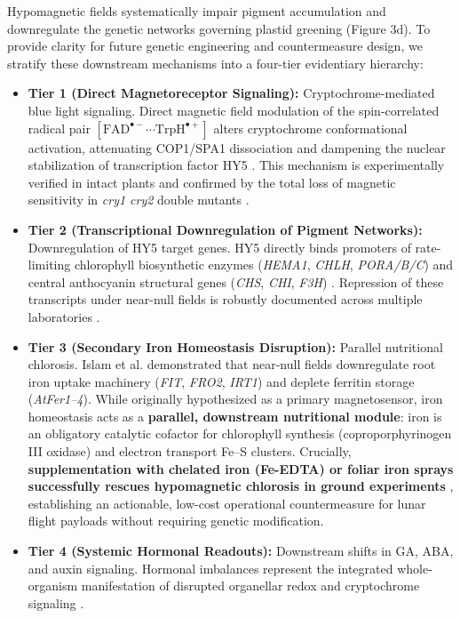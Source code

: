 \documentclass[default,sn-nature,iicol]{sn-jnl}
\begin{document}
Hypomagnetic fields systematically impair pigment accumulation and downregulate the genetic networks governing plastid greening (Figure 3d). To provide clarity for future genetic engineering and countermeasure design, we stratify these downstream mechanisms into a four-tier evidentiary hierarchy:
\begin{itemize}
\item \textbf{Tier 1 (Direct Magnetoreceptor Signaling):} Cryptochrome-mediated blue light signaling. Direct magnetic field modulation of the spin-correlated radical pair $[\text{FAD}^{\bullet-} \cdots \text{TrpH}^{\bullet+}]$ alters cryptochrome conformational activation, attenuating COP1/SPA1 dissociation and dampening the nuclear stabilization of transcription factor HY5 \cite{ref49,ref50,ref51,ref58}. This mechanism is experimentally verified in intact plants and confirmed by the total loss of magnetic sensitivity in \textit{cry1 cry2} double mutants \cite{ref51,ref58}.
\item \textbf{Tier 2 (Transcriptional Downregulation of Pigment Networks):} Downregulation of HY5 target genes. HY5 directly binds promoters of rate-limiting chlorophyll biosynthetic enzymes (\textit{HEMA1}, \textit{CHLH}, \textit{PORA/B/C}) and central anthocyanin structural genes (\textit{CHS}, \textit{CHI}, \textit{F3H}) \cite{ref47,ref48}. Repression of these transcripts under near-null fields is robustly documented across multiple laboratories \cite{ref31,ref44,ref45,ref46}.
\item \textbf{Tier 3 (Secondary Iron Homeostasis Disruption):} Parallel nutritional chlorosis. Islam et al. \cite{ref53,ref54} demonstrated that near-null fields downregulate root iron uptake machinery (\textit{FIT}, \textit{FRO2}, \textit{IRT1}) and deplete ferritin storage (\textit{AtFer1--4}). While originally hypothesized as a primary magnetosensor, iron homeostasis acts as a \textbf{parallel, downstream nutritional module}: iron is an obligatory catalytic cofactor for chlorophyll synthesis (coproporphyrinogen III oxidase) and electron transport Fe--S clusters. Crucially, \textbf{supplementation with chelated iron (Fe-EDTA) or foliar iron sprays successfully rescues hypomagnetic chlorosis in ground experiments} \cite{ref53}, establishing an actionable, low-cost operational countermeasure for lunar flight payloads without requiring genetic modification.
\item \textbf{Tier 4 (Systemic Hormonal Readouts):} Downstream shifts in GA, ABA, and auxin signaling. Hormonal imbalances represent the integrated whole-organism manifestation of disrupted organellar redox and cryptochrome signaling \cite{ref35,ref36}.
\end{itemize}
\end{document}
